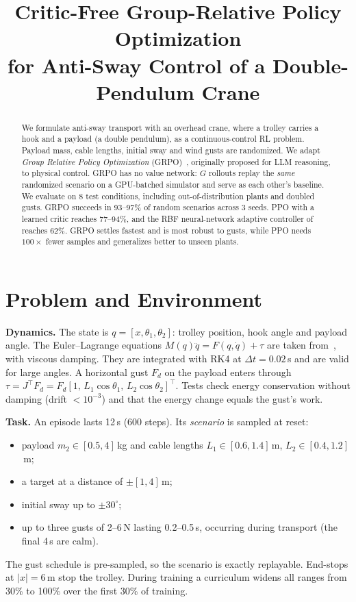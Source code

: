 \documentclass[10pt,conference]{IEEEtran}
\begin{document}
\title{Critic-Free Group-Relative Policy Optimization\\for Anti-Sway Control of a Double-Pendulum Crane}

\author{
}

\maketitle

\begin{abstract}
We formulate anti-sway transport with an overhead crane, where a trolley carries a hook and a payload (a double pendulum), as a continuous-control RL problem. Payload mass, cable lengths, initial sway and wind gusts are randomized. We adapt \emph{Group Relative Policy Optimization} (GRPO)~\cite{grpo}, originally proposed for LLM reasoning, to physical control. GRPO has no value network: $G$ rollouts replay the \emph{same} randomized scenario on a GPU-batched simulator and serve as each other's baseline. We evaluate on 8 test conditions, including out-of-distribution plants and doubled gusts. GRPO succeeds in 93--97\% of random scenarios across 3 seeds. PPO with a learned critic reaches 77--94\%, and the RBF neural-network adaptive controller of~\cite{qiang2021} reaches 62\%. GRPO settles fastest and is most robust to gusts, while PPO needs $100\times$ fewer samples and generalizes better to unseen plants.
\end{abstract}

\section{Problem and Environment}
\textbf{Dynamics.} The state is $q=[x,\theta_1,\theta_2]$: trolley position, hook angle and payload angle. The Euler--Lagrange equations $M(q)\ddot q = F(q,\dot q) + \tau$ are taken from~\cite{qiang2021}, with viscous damping. They are integrated with RK4 at $\Delta t=0.02$\,s and are valid for large angles. A horizontal gust $F_d$ on the payload enters through $\tau = J^\top F_d = F_d[1,\,L_1\cos\theta_1,\,L_2\cos\theta_2]^\top$. Tests check energy conservation without damping (drift $<10^{-3}$) and that the energy change equals the gust's work.

\textbf{Task.} An episode lasts 12\,s (600 steps). Its \emph{scenario} is sampled at reset:
\begin{itemize}
\item payload $m_2\!\in\![0.5,4]$\,kg and cable lengths $L_1\!\in\![0.6,1.4]$\,m, $L_2\!\in\![0.4,1.2]$\,m;
\item a target at a distance of $\pm[1,4]$\,m;
\item initial sway up to $\pm30^\circ$;
\item up to three gusts of 2--6\,N lasting 0.2--0.5\,s, occurring during transport (the final 4\,s are calm).
\end{itemize}
The gust schedule is pre-sampled, so the scenario is exactly replayable. End-stops at $|x|=6$\,m stop the trolley. During training a curriculum widens all ranges from 30\% to 100\% over the first 30\% of training.
\end{document}
